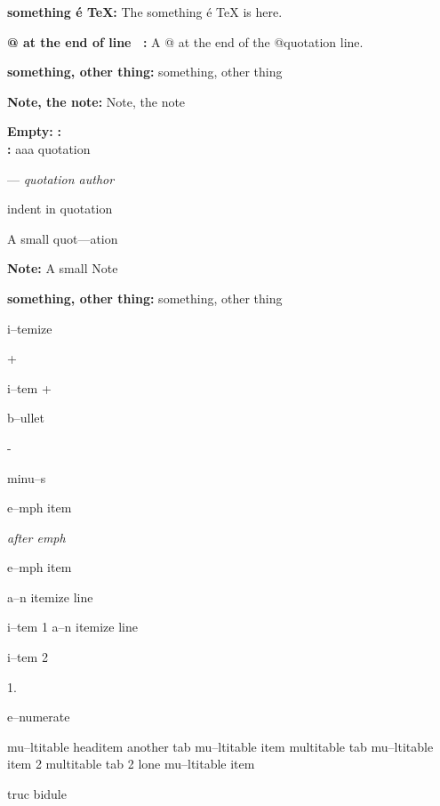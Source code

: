 \documentclass{book}
\begin{document}
\begin{titlepage}
\textbf{something \'{e} \TeX{}:} The something \'{e} \TeX{} is here.

\textbf{@ at the end of line \ {}:} A @ at the end of the @quotation line.

\textbf{something, other thing:} something, other thing

\textbf{Note, the note:} Note, the note


\textbf{Empty:} 
\textbf{:} 
\textbf{\leavevmode{}\\:} 
aaa quotation
\begin{center}
--- \emph{quotation author}
\end{center}

indent in quotation

A small quot---ation

\textbf{Note:} A small Note

\textbf{something, other thing:} something, other thing

\textbullet{} 

i--temize

+ 

i--tem +

\textbullet{} 

b--ullet

- 

minu--s

\emph{} 

e--mph item

\emph{after emph} 

e--mph item

\textbullet{} a--n itemize line 

i--tem 1
\textbullet{} a--n itemize line 

i--tem 2

1. 

e--numerate

mu--ltitable headitem another tab
mu--ltitable item multitable tab
mu--ltitable item 2 multitable tab 2
lone mu--ltitable item

truc bidule


\end{titlepage}
\end{document}

